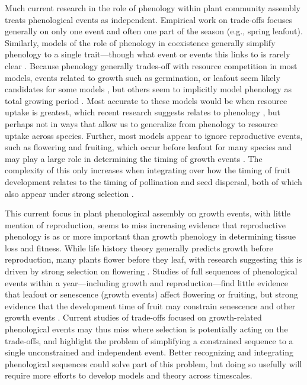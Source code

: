 \documentclass[11pt]{article}
\begin{document}
Much current research in the role of phenology within plant community assembly treats phenological events as independent. Empirical work on trade-offs focuses generally on only one event and often one part of the season (e.g., spring leafout). Similarly, models of the role of phenology in coexistence generally simplify phenology to a single trait---though what event or events this links to is rarely clear \citep[even when studied with empirical data][]{godoy2014}. Because phenology generally trades-off with resource competition in most models, events related to growth such as germination, or leafout seem likely candidates for some models \citep[e.g.,][]{godoy2014,memegan2021}, but others seem to implicitly model phenology as total growing period \citep{levine2022competition}. Most accurate to these models would be when resource uptake is greatest, which recent research suggests relates to phenology \citep{Heberling2013,heberling2019}, but perhaps not in ways that allow us to generalize from phenology to resource uptake across species. Further, most models appear to ignore reproductive events, such as flowering and fruiting, which occur before leafout for many species \citep{Primack:1987jz,dan2021nph} and may play a large role in determining the timing of growth events \citep{ettinger2018phenological}. The complexity of this only increases when integrating over how the timing of fruit development relates to the timing of pollination and seed dispersal, both of which also appear under strong selection \citep{whitehead1969wind}.


This current focus in plant phenological assembly on growth events, with little mention of reproduction, seems to miss increasing evidence that reproductive phenology is as or more important than growth phenology in determining tissue loss and fitness. While life history theory generally predicts growth before reproduction, many plants flower before they leaf, with research suggesting this is driven by strong selection on flowering \citep{dan2021nph}. Studies of full sequences of phenological events within a year---including growth and reproduction---find little evidence that leafout or senescence (growth events) affect flowering or fruiting, but strong evidence that the development time of fruit may constrain senescence and other growth events \citep{ettinger2018phenological}. Current studies of trade-offs focused on growth-related phenological events may thus miss where selection is potentially acting on the trade-offs, and highlight the problem of simplifying a constrained sequence to a single unconstrained and independent event. Better recognizing and integrating phenological sequences could solve part of this problem, but doing so usefully will require more efforts to develop models and theory across timescales. 
\end{document}

